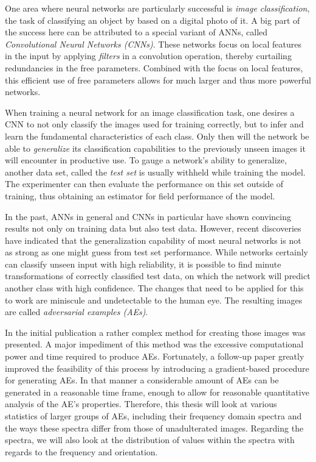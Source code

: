 \documentclass[11pt, a4paper]{article}
\begin{document}
One area where neural networks are particularly successful is \emph{image classification}, the task of classifying an object by based on a digital photo of it. A big part of the success here can be attributed to a special variant of ANNs, called \emph{Convolutional Neural Networks (CNNs)}. These networks focus on local features in the input by applying \emph{filters} in a convolution operation, thereby curtailing redundancies in the free parameters. Combined with the focus on local features, this efficient use of free parameters allows for much larger and thus more powerful networks.

When training a neural network for an image classification task, one desires a CNN to not only classify the images used for training correctly, but to infer and learn the fundamental characteristics of each class. Only then will the network be able to \emph{generalize} its classification capabilities to the previously unseen images it will encounter in productive use. To gauge a network's ability to generalize, another data set, called the \emph{test set} is usually withheld while training the model. The experimenter can then evaluate the performance on this set outside of training, thus obtaining an estimator for field performance of the model.

In the past, ANNs in general and CNNs in particular have shown convincing results not only on training data but also test data. However, recent discoveries have indicated that the generalization capability of most neural networks is not as strong as one might guess from test set performance. While networks certainly can classify unseen input with high reliability, it is possible to find minute transformations of correctly classified test data, on which the network will predict another class with high confidence. The changes that need to be applied for this to work are miniscule and undetectable to the human eye. The resulting images are called \emph{adversarial examples (AEs)}.

In the initial publication a rather complex method for creating those images was presented. A major impediment of this method was the excessive computational power and time required to produce AEs. Fortunately, a follow-up paper greatly improved the feasibility of this process by introducing a gradient-based procedure for generating AEs. In that manner a considerable amount of AEs can be generated in a reasonable time frame, enough to allow for reasonable quantitative analysis of the AE's properties. Therefore, this thesis will look at various statistics of larger groups of AEs, including their frequency domain spectra and the ways these spectra differ from those of unadulterated images. Regarding the spectra, we will also look at the distribution of values within the spectra with regards to the frequency and orientation.
\end{document}
